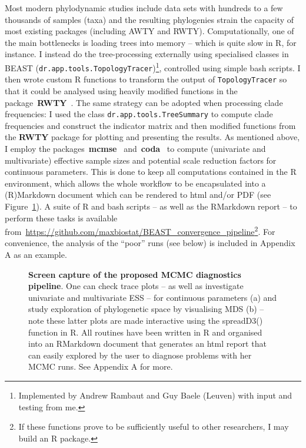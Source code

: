 Most modern phylodynamic studies include data sets with hundreds to a few thousands of samples (taxa) and the resulting phylogenies strain the capacity of most existing packages (including AWTY and RWTY).
Computationally, one of the main bottlenecks is loading trees into memory -- which is quite slow in R, for instance.
I instead do the tree-processing externally using specialised classes in BEAST (\verb|dr.app.tools.TopologyTracer|)\footnote{Implemented by Andrew Rambaut and Guy Baele (Leuven) with input and testing from me.}, controlled using simple bash scripts.
I then wrote custom R functions to transform the output of \verb|TopologyTracer| so that it could be analysed using heavily modified functions in the package~\textbf{RWTY}~\cite{Warren2017}.
The same strategy can be adopted when processing clade frequencies: I used the class \verb|dr.app.tools.TreeSummary| to compute clade frequencies and construct the indicator matrix and then modified functions from the \textbf{RWTY} package for plotting and presenting the results.
As mentioned above, I employ the packages~\textbf{mcmse}~\citep{Flegal2017} and~\textbf{coda}~\citep{Plummer2006} to compute (univariate and multivariate) effective sample sizes and potential scale reduction factors for continuous parameters.
This is done to keep all computations contained in the R environment, which allows the whole workflow to be encapsulated into a (R)Markdown document which can be rendered to html and/or PDF (see Figure~\ref{fig:pipeline}).
A suite of R and bash scripts -- as well as the RMarkdown report --  to perform these tasks is available from~\url{https://github.com/maxbiostat/BEAST_convergence_pipeline}\footnote{If these functions prove to be sufficiently useful to other researchers, I may build an R package.}.
For convenience, the analysis of the ``poor'' runs (see below) is included in Appendix A as an example.
\begin{figure}[!ht]
\begin{center}
\end{center}
 \caption[Screen capture of the proposed MCMC diagnostics pipeline.]{\textbf{Screen capture of the proposed MCMC diagnostics pipeline}.
One can check  trace plots -- as well as investigate univariate and multivariate ESS -- for continuous parameters (a) and study exploration of phylogenetic space by visualising MDS (b) -- note these latter plots are made interactive  using the spreadD3() function in R.
All routines have been written in R and organised into an RMarkdown document that generates an html report that can easily explored by the user to diagnose problems with her MCMC runs.
See Appendix A for more.
 }
 \label{fig:pipeline}
\end{figure}

